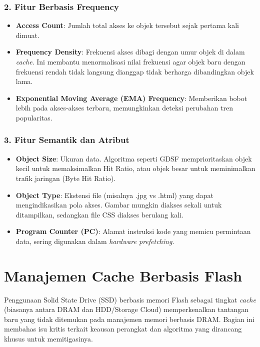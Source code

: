 \subsubsection{2. Fitur Berbasis Frequency}
\begin{itemize}
  \item \textbf{Access Count}: Jumlah total akses ke objek tersebut
    sejak pertama kali dimuat.
  \item \textbf{Frequency Density}: Frekuensi akses dibagi dengan
    umur objek di dalam \textit{cache}. Ini membantu menormalisasi
    nilai frekuensi agar objek baru dengan frekuensi rendah tidak
    langsung dianggap tidak berharga dibandingkan objek lama.
  \item \textbf{Exponential Moving Average (EMA) Frequency}: Memberikan
    bobot lebih pada akses-akses terbaru, memungkinkan deteksi
    perubahan tren popularitas.
\end{itemize}

\subsubsection{3. Fitur Semantik dan Atribut}
\begin{itemize}
  \item \textbf{Object Size}: Ukuran data. Algoritma seperti GDSF
    memprioritaskan objek kecil untuk memaksimalkan Hit Ratio, atau
    objek besar untuk meminimalkan trafik jaringan (Byte Hit Ratio).
  \item \textbf{Object Type}: Ekstensi file (misalnya .jpg vs .html)
    yang dapat mengindikasikan pola akses. Gambar mungkin diakses sekali
    untuk ditampilkan, sedangkan file CSS diakses berulang kali.
  \item \textbf{Program Counter (PC)}: Alamat instruksi kode yang
    memicu permintaan data, sering digunakan dalam \textit{hardware
    prefetching}.
\end{itemize}

\section{Manajemen Cache Berbasis Flash}
Penggunaan Solid State Drive (SSD) berbasis memori Flash sebagai
tingkat \textit{cache} (biasanya antara DRAM dan HDD/Storage Cloud)
memperkenalkan tantangan baru yang tidak ditemukan pada manajemen
memori berbasis DRAM. Bagian ini membahas isu kritis terkait keausan
perangkat dan algoritma yang dirancang khusus untuk memitigasinya.

